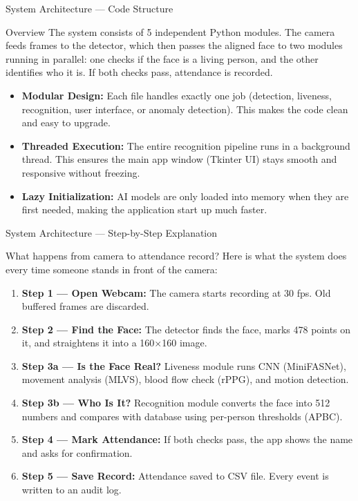 \documentclass[aspectratio=169,11pt]{beamer}
\begin{document}
\begin{frame}{System Architecture --- Code Structure}
\begin{block}{Overview}
The system consists of 5 independent Python modules. The camera feeds frames to the detector, which then passes the aligned face to two modules running in parallel: one checks if the face is a living person, and the other identifies who it is. If both checks pass, attendance is recorded.
\end{block}
\vspace{10pt}
\begin{itemize}\setlength\itemsep{8pt}
  \item \textbf{Modular Design:} Each file handles exactly one job (detection, liveness, recognition, user interface, or anomaly detection). This makes the code clean and easy to upgrade.
  \item \textbf{Threaded Execution:} The entire recognition pipeline runs in a background thread. This ensures the main app window (Tkinter UI) stays smooth and responsive without freezing.
  \item \textbf{Lazy Initialization:} AI models are only loaded into memory when they are first needed, making the application start up much faster.
\end{itemize}
\end{frame}

\begin{frame}{System Architecture --- Step-by-Step Explanation}\small
\begin{block}{What happens from camera to attendance record?}\small
Here is what the system does every time someone stands in front of the camera:
\end{block}
\vspace{-2pt}
\footnotesize
\begin{enumerate}\setlength\itemsep{2pt}
  \item \textbf{Step 1 --- Open Webcam:} The camera starts recording at 30 fps. Old buffered frames are discarded.
  \item \textbf{Step 2 --- Find the Face:} The detector finds the face, marks 478 points on it, and straightens it into a 160$\times$160 image.
  \item \textbf{Step 3a --- Is the Face Real?} Liveness module runs CNN (MiniFASNet), movement analysis (MLVS), blood flow check (rPPG), and motion detection.
  \item \textbf{Step 3b --- Who Is It?} Recognition module converts the face into 512 numbers and compares with database using per-person thresholds (APBC).
  \item \textbf{Step 4 --- Mark Attendance:} If both checks pass, the app shows the name and asks for confirmation.
  \item \textbf{Step 5 --- Save Record:} Attendance saved to CSV file. Every event is written to an audit log.
\end{enumerate}
\end{frame}
\end{document}
